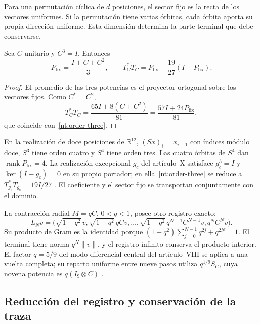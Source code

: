 Para una permutación cíclica de \(d\) posiciones, el sector fijo
es la recta de los vectores uniformes. Si la permutación tiene
varias órbitas, cada órbita aporta su propia dirección uniforme.
Esta dimensión determina la parte terminal que debe conservarse.

\begin{proposition}
Sea \(C\) unitario y \(C^3=I\). Entonces
\begin{equation}
 P_{\mathrm{fix}}=\frac{I+C+C^2}{3},
 \qquad
 T_C^*T_C=P_{\mathrm{fix}}+
 \frac{19}{27}(I-P_{\mathrm{fix}}).
 \label{nt:order-three}
\end{equation}
\end{proposition}

\begin{proof}
El promedio de las tres potencias es el proyector ortogonal
sobre los vectores fijos. Como \(C^*=C^2\),
\[
 T_C^*T_C=\frac{65I+8(C+C^2)}{81}
 =\frac{57I+24P_{\mathrm{fix}}}{81},
\]
que coincide con~\eqref{nt:order-three}.
\end{proof}

En la realización de doce posiciones de
\(\mathbb R^{12}\), \((Sx)_i=x_{i+1}\) con índices módulo
doce, \(S^3\) tiene orden cuatro y \(S^4\) tiene orden tres.
Las cuatro órbitas de \(S^4\) dan
\(\operatorname{rank}P_{\mathrm{fix}}=4\).
La realización excepcional \(g_c\) del artículo~X satisface
\(g_c^3=I\) y \(\ker(I-g_c)=0\) en su propio portador;
en ella~\eqref{nt:order-three} se reduce a
\(T_{g_c}^*T_{g_c}=19I/27\)
\cite{hmtX}. El coeficiente y el sector fijo se transportan
conjuntamente con el dominio.

La contracción radial \(M=qC\), \(0<q<1\), posee otro registro
exacto:
\begin{equation}
 L_Nv=\bigl(\sqrt{1-q^2}\,v,
 \sqrt{1-q^2}\,qCv,\ldots,
 \sqrt{1-q^2}\,q^{N-1}C^{N-1}v,q^NC^Nv\bigr).
 \label{nt:radial-record}
\end{equation}
Su producto de Gram es la identidad porque
\((1-q^2)\sum_{j=0}^{N-1}q^{2j}+q^{2N}=1\).
El terminal tiene norma \(q^N\|v\|\), y el registro infinito
conserva el producto interior. El factor \(q=5/9\) del modo
diferencial central del artículo~VIII se aplica a una vuelta
completa; su reparto uniforme entre nueve pasos utiliza
\(q^{1/9}S_C\), cuya novena potencia es
\(q(I_9\otimes C)\) \cite{HMT-VIII}.

\subsection{Reducción del registro y conservación de la traza}

